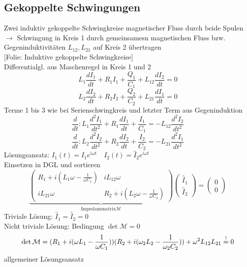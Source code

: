 \documentclass[titlepage,12pt,a4paper,ngerman]{report}
\newcommand{\tx}[1]{\textrm{#1}}
\newcommand{\ub}[1]{\underbrace{#1}}
\newcommand{\folie}[1]{\color{gray}[Folie: #1]\color{black}}
\begin{document}
\subsection{Gekoppelte Schwingungen}
Zwei induktiv gekoppelte Schwingkreise magnetischer Fluss durch beide Spulen\\
$ \rightarrow $ Schwingung in Kreis 1 durch gemeinsamesn magnetischen Fluss bzw. Gegeninduktivitäten $ L_{12},L_{21} $ auf Kreis 2 übertragen\\
\folie{Induktive gekoppelte Schwingkreise}\\[10pt]
Differentialgl. aus Maschenregel in Kreis 1 und 2
$$ L_{1} \frac{d I_1}{dt} + R_1 I_1 + \frac{Q_1}{C_1} + L_{12}\frac{dI_2}{dt} = 0$$
$$ L_{2} \frac{d I_2}{dt} + R_2 I_2 + \frac{Q_2}{C_2} + L_{21}\frac{dI_1}{dt} = 0$$
Terme 1 bis 3 wie bei Serienschwingkreis und letzter Term aus Gegeninduktion\\
$$\frac{d}{dt}: L_1 \frac{d^2I_1}{dt^2} + R_1 \frac{dI_1}{dt} + \frac{I_1}{C_1} = - L_{12} \frac{d^2 I_2}{dt^2}$$
$$\frac{d}{dt}: L_2 \frac{d^2I_2}{dt^2} + R_2 \frac{dI_2}{dt} + \frac{I_2}{C_2} = - L_{21} \frac{d^2 I_1}{dt^2}$$
Lösungsansatz: $ I_1(t) = \hat{I}_1 e^{i\omega t} \quad I_2(t) = \hat{I}_2 e ^{i \omega t} $\\
Einsetzen in DGL und sortieren
$$\ub{\begin{pmatrix}
R_1 + i (L_1 \omega - \frac{1}{\omega C_1}) & i L_{12} \omega \\
i L_{21} \omega & R_2 + i(L_2\omega - \frac{1}{\omega C_2})
\end{pmatrix}}_{\tx{Impedanzmatrix} \mathcal{M}} \begin{pmatrix}
\hat{I}_1\\
\hat{I}_2
\end{pmatrix} = \begin{pmatrix}
0 \\ 0
\end{pmatrix}$$
Triviale Lösung: $ \hat{I}_1 = \hat{I}_2 = 0 $\\
Nicht triviale Lösung: Bedingung $ \det \mathcal{M} = 0 $\\
$$\det \mathcal{M} = (R_1 + i(\omega L_1 - \frac{1}{\omega C_1}) )(R_2 + i(\omega_2 L_2 - \frac{1}{\omega_2 C_2})) + \omega^2 L_{12} L_{21} \buildrel ! \over = 0 $$
allgemeiner Lösungsansatz 


\end{document}
